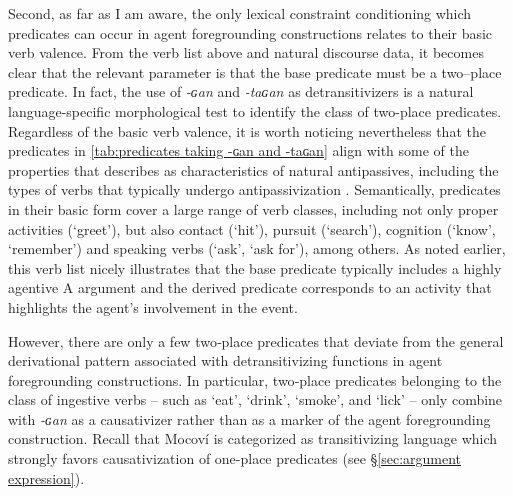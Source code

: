 \documentclass[12pt]{article}
\begin{document}



%
%

  Second, as far as I am aware, the only  lexical constraint conditioning which predicates can occur in agent foregrounding constructions relates to their basic verb valence. From the verb list above and natural discourse data, it becomes clear that the  relevant parameter is that the base predicate must be a two--place predicate. In fact, the use of \textit{-ɢan} and \textit{-taɢan} as detransitivizers is a natural language-specific morphological test to identify the class of two-place predicates. Regardless of the basic verb valence, it is worth noticing nevertheless that the predicates in \autoref{tab:predicates taking -ɢan and -taɢan} align with some of the properties that \citet[][182]{say2021} describes as characteristics of natural antipassives, including the types of verbs that typically undergo antipassivization \citep[see, the verb hierarchy proposed by][]{malchukov2015}. Semantically, predicates in their basic form cover a large range of verb classes, including not only proper activities (`greet'), but also contact (`hit'), pursuit (`search'), cognition (`know', `remember') and speaking verbs (`ask', `ask for'), among others. As noted earlier, this verb list nicely illustrates that the base predicate typically includes a highly agentive A argument and the derived predicate corresponds to an activity that highlights the agent's involvement in the event.
  
  However, there are only a few two‑place predicates that deviate from the general derivational pattern associated with detransitivizing functions in agent foregrounding constructions. In particular, two‑place predicates belonging to the class of ingestive verbs -- such as ‘eat’, ‘drink’, ‘smoke’, and ‘lick’ -- only combine with  \textit{-ɢan} as a causativizer rather than as a marker of the agent foregrounding construction. Recall that Mocoví is categorized as transitivizing language which strongly favors causativization of one-place predicates (see \S \ref{sec:argument expression}).
  
\end{document}
